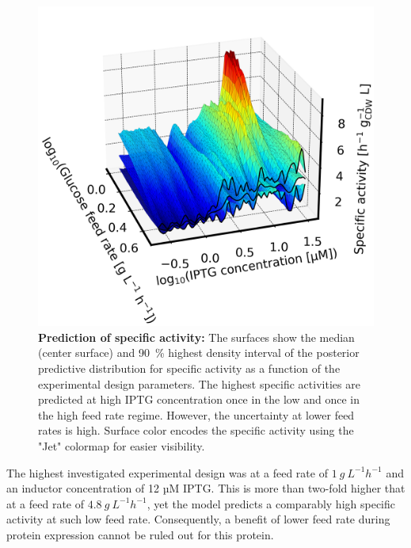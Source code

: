 \documentclass[sn-standardnature]{sn-jnl}%
\theoremstyle{thmstyleone}%
\theoremstyle{thmstyletwo}%
\theoremstyle{thmstylethree}%
\begin{document}
\begin{figure}[h]
    \centering
    \includegraphics[width=1.0\textwidth]{figures/plot_3d_pp_dense_s_design.png}
    \caption{
        \textbf{Prediction of specific activity:}
        The surfaces show the median (center surface) and 90~\% highest density interval of the posterior predictive distribution for specific activity as a function of the experimental design parameters.
        The highest specific activities are predicted at high IPTG concentration once in the low and once in the high feed rate regime.
        However, the uncertainty at lower feed rates is high.
        Surface color encodes the specific activity using the "Jet" colormap \cite{matplotlibDocs} for easier visibility.
    }
    \label{fig_3Dsdesign}
\end{figure}


The highest investigated experimental design was at a feed rate of $1\ g\ L^{-1} h^{-1}$ and an inductor concentration of 12 µM IPTG.
This is more than two-fold higher that at a feed rate of $4.8\ g\ L^{-1} h^{-1}$, yet the model predicts a comparably high specific activity at such low feed rate.
Consequently, a benefit of lower feed rate during protein expression cannot be ruled out for this protein.
\end{document}
